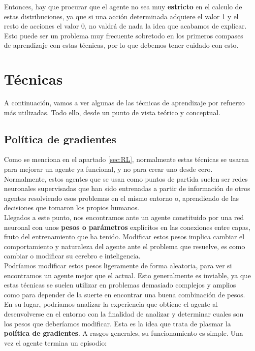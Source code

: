 \documentclass[11pt,fleqn]{book} %
\begin{document}
Entonces, hay que procurar que el agente no sea muy \textbf{estricto} en el calculo de estas distribuciones, ya que si una acción determinada adquiere el valor 1 y el resto de acciones el valor 0, no valdrá de nada la idea que acabamos de explicar. Esto puede ser un problema muy frecuente sobretodo en los primeros compases de aprendizaje con estas técnicas, por lo que debemos tener cuidado con esto.

\section{Técnicas}\label{sec:tectnicasRL}

A continuación, vamos a ver algunas de las técnicas de aprendizaje por refuerzo más utilizadas. Todo ello, desde un punto de vista teórico y conceptual.

\subsection{Política de gradientes}\label{sec:politicaGradientes}

Como se menciona en el apartado \ref{sec:RL}, normalmente estas técnicas se usaran para mejorar un agente ya funcional, y no para crear uno desde cero. Normalmente, estos agentes que se usan como puntos de partida suelen ser redes neuronales supervisadas que han sido entrenadas a partir de información de otros agentes resolviendo esos problemas en el mismo entorno o, aprendiendo de las decisiones que tomaron los propios humanos. \\

Llegados a este punto, nos encontramos ante un agente constituido por una red neuronal con unos \textbf{pesos o parámetros} explícitos en las conexiones entre capas, fruto del entrenamiento que ha tenido. Modificar estos pesos implica cambiar el comportamiento y naturaleza del agente ante el problema que resuelve, es como cambiar o modificar su cerebro e inteligencia. \\

Podríamos modificar estos pesos ligeramente de forma aleatoria, para ver si encontramos un agente mejor que el actual. Esto generalmente es inviable, ya que estas técnicas se suelen utilizar en problemas demasiado complejos y amplios como para depender de la suerte en encontrar una buena combinación de pesos.\\

En su lugar, podríamos analizar la experiencia que obtiene el agente al desenvolverse en el entorno con la finalidad de analizar y determinar cuales son los pesos que deberíamos modificar. Esta es la idea que trata de plasmar  la \textbf{política de gradientes}. A rasgos generales, su funcionamiento es simple. Una vez el agente termina un episodio: \\
\end{document}

